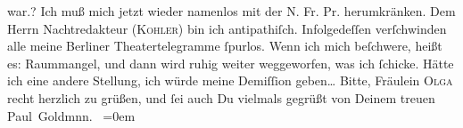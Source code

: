\begin{ledgroupsized}[t]{13cm}
{{{                  war.}}}\label{K_L03066-4h}?\pend
           \pstart
           Ich muß mich jetzt wieder namenlos {\pb}mit der N. Fr. Pr. herumkränken. Dem Herrn Nachtredakteur (\textsc{Kohler}) bin ich antipathiſch. Infolgedeſſen verſchwinden alle meine Berliner Theatertelegramme ſpurlos. Wenn ich mich beſchwere,
               heißt es: Raummangel, und dann wird ruhig weiter weggeworfen, was ich ſchicke. Hätte
               ich eine andere Stellung, ich würde meine Demiſſion geben{\dots}\pend
           \pstart
           Bitte, Fräulein \textsc{Olga} recht herzlich zu grüßen, und ſei auch Du vielmals gegrüßt von Deinem treuen {\\[\baselineskip]}\spacefill\mbox{Paul Goldmnn. }\pend
           \leftskip=0em{}
         
         \endnumbering{}\end{ledgroupsized}  \newcommand{\dateiname}{L03066}\newcommand{\titel}{Paul Goldmann an Arthur Schnitzler, 13. 5. [1901]}\newcommand{\editorInnen}{Martin Anton Müller und Laura Untner}
      